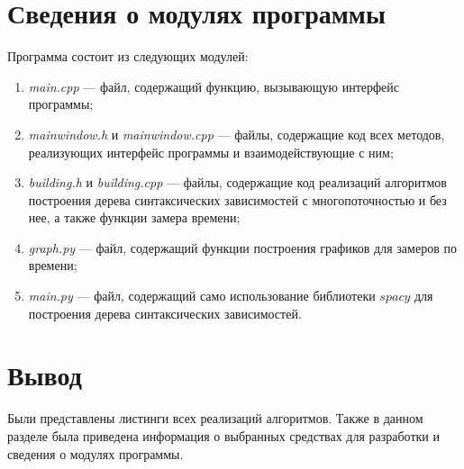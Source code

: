 \section{Сведения о модулях программы}
Программа состоит из следующих модулей:
\begin{enumerate}[label=\arabic*)]
	\item \textit{main.cpp} --- файл, содержащий функцию, вызывающую интерфейс программы;
    \item \textit{mainwindow.h} и \textit{mainwindow.cpp} --- файлы, содержащие код всех методов, реализующих интерфейс программы и взаимодействующие с ним;
	\item \textit{building.h} и \textit{building.cpp} --- файлы, содержащие код реализаций алгоритмов построения дерева синтаксических зависимостей с многопоточностью и без нее, а также функции замера времени;
	\item \textit{graph.py} --- файл, содержащий функции построения графиков для замеров по времени;
	\item \textit{main.py} --- файл, содержащий само использование библиотеки $spacy$ для построения дерева синтаксических зависимостей.
\end{enumerate}

\section{Вывод}

Были представлены листинги всех реализаций алгоритмов. Также в данном разделе была приведена информация о выбранных средствах для разработки и сведения о модулях программы.
